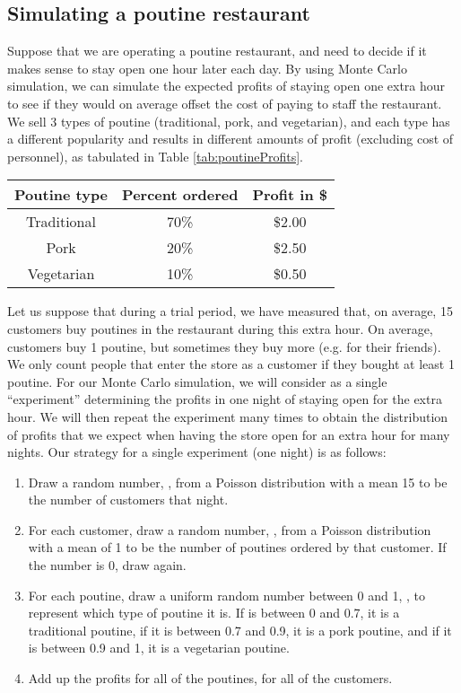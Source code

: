 \subsection{Simulating a poutine restaurant}
Suppose that we are operating a poutine restaurant, and need to decide if it makes sense to stay open one hour later each day. By using Monte Carlo simulation, we can simulate the expected profits of staying open one extra hour to see if they would on average offset the cost of paying to staff the restaurant. We sell 3 types of poutine (traditional, pork, and vegetarian), and each type has a different popularity and results in different amounts of profit (excluding cost of personnel), as tabulated in Table \ref{tab:poutineProfits}.
\begin{center}
\begin{tabular}{|c|c|c|}
\hline
\textbf{Poutine type} & \textbf{Percent ordered} & \textbf{Profit in \$}\\
\hline
Traditional & 70\% & \$2.00\\
\hline
Pork & 20\% & \$2.50\\
\hline
Vegetarian & 10\% & \$0.50\\
\hline
\end{tabular}
\end{center}

Let us suppose that during a trial period, we have measured that, on average, 15 customers buy poutines in the restaurant during this extra hour. On average, customers buy 1 poutine, but sometimes they buy more (e.g. for their friends). We only count people that enter the store as a customer if they bought at least 1 poutine. For our Monte Carlo simulation, we will consider as a single ``experiment'' determining the profits in one night of staying open for the extra hour. We will then repeat the experiment many times to obtain the distribution of profits that we expect when having the store open for an extra hour for many nights. Our strategy for a single experiment (one night) is as follows:
\begin{enumerate}
\item Draw a random number, , from a Poisson distribution with a mean 15 to be the number of customers that night.
\item For each customer, draw a random number, , from a Poisson distribution with a mean of 1 to be the number of poutines ordered by that customer. If the number is 0, draw again. 
\item For each poutine, draw a uniform random number between 0 and 1, , to represent which type of poutine it is. If  is between 0 and 0.7, it is a traditional poutine, if it is between 0.7 and 0.9, it is a pork poutine, and if it is between 0.9 and 1, it is a vegetarian poutine.
\item Add up the profits for all of the poutines, for all of the customers.
\end{enumerate}


